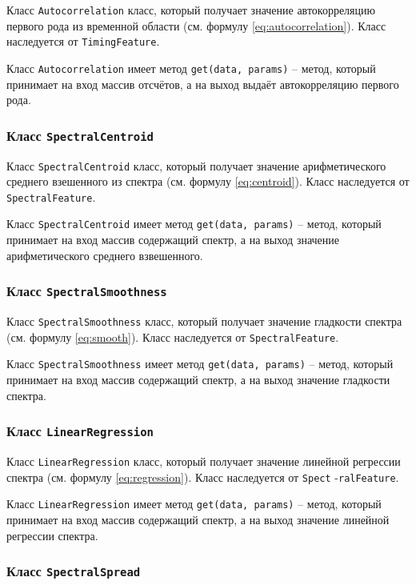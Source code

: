 Класс \texttt{Autocorrelation} класс, который получает значение автокорреляцию первого рода из временной области (см. формулу \ref{eq:autocorrelation}). Класс наследуется от \texttt{TimingFeature}.

Класс \texttt{Autocorrelation} имеет  метод \texttt{get(data, params)} --  метод, который принимает на вход массив отсчётов, а на выход выдаёт автокорреляцию первого рода. 

\subsubsection{Класс \texttt{SpectralCentroid}}

Класс \texttt{SpectralCentroid} класс, который получает значение арифметического среднего взешенного из спектра (см. формулу \ref{eq:centroid}). Класс наследуется от \texttt{SpectralFeature}.

Класс \texttt{SpectralCentroid} имеет метод \texttt{get(data, params)} --  метод, который принимает на вход массив содержащий спектр, а на выход  значение арифметического среднего взвешенного. 

\subsubsection{Класс \texttt{SpectralSmoothness}}

Класс \texttt{SpectralSmoothness} класс, который получает значение гладкости спектра (см. формулу \ref{eq:smooth}). Класс наследуется от \texttt{SpectralFeature}.

Класс \texttt{SpectralSmoothness} имеет метод \texttt{get(data, params)} --  метод, который принимает на вход массив содержащий спектр, а на выход значение гладкости спектра.

\subsubsection{Класс \texttt{LinearRegression}}

Класс \texttt{LinearRegression} класс, который получает значение линейной регрессии спектра  (см. формулу \ref{eq:regression}). Класс наследуется от \texttt{Spect} -\texttt{ralFeature}.

Класс \texttt{LinearRegression} имеет метод \texttt{get(data, params)} --  метод, который принимает на вход массив содержащий спектр, а на выход  значение линейной регрессии спектра.

\subsubsection{Класс \texttt{SpectralSpread}}

